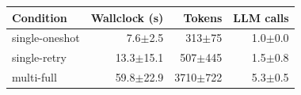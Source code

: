 \begin{tabular}{@{}lrrr@{}}
\toprule
Condition & Wallclock (s) & Tokens & LLM calls \\
\midrule
single-oneshot & 7.6$\pm$2.5 & 313$\pm$75 & 1.0$\pm$0.0 \\
single-retry & 13.3$\pm$15.1 & 507$\pm$445 & 1.5$\pm$0.8 \\
multi-full & 59.8$\pm$22.9 & 3710$\pm$722 & 5.3$\pm$0.5 \\
\bottomrule
\end{tabular}

